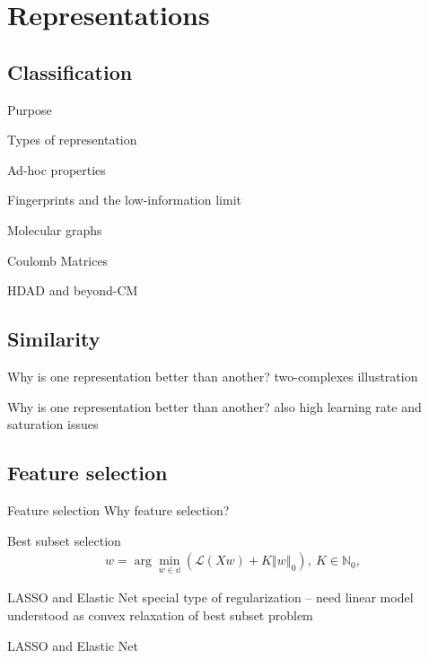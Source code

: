 
\section{Representations}
\subsection{Classification}
\begin{frame}{Purpose}

\end{frame}
\begin{frame}{Types of representation}

\end{frame}
\begin{frame}{Ad-hoc properties}

\end{frame}
\begin{frame}{Fingerprints and the low-information limit}

\end{frame}
\begin{frame}{Molecular graphs}

\end{frame}
\begin{frame}{Coulomb Matrices}

\end{frame}
\begin{frame}{HDAD and beyond-CM}

\end{frame}
\subsection{Similarity}
\begin{frame}{Why is one representation better than another?}
two-complexes illustration 
\end{frame}
\begin{frame}{Why is one representation better than another?}
also high learning rate and saturation issues
\end{frame}

\subsection{Feature selection}
\begin{frame}{Feature selection}
Why feature selection?
\end{frame}
\begin{frame}{Best subset selection}
\begin{align*}
w=\arg\min_{w\in \mathbb{d}}\left(\mathcal{L}\left(Xw\right) + K\left\Vert w \right\Vert_0\right), \: K\in\mathbb{N}_{0},
\end{align*}
\end{frame}
\begin{frame}{LASSO and Elastic Net}
special type of regularization -- need linear model
understood as convex relaxation of best subset problem
\end{frame}
\begin{frame}{LASSO and Elastic Net}

\end{frame}
